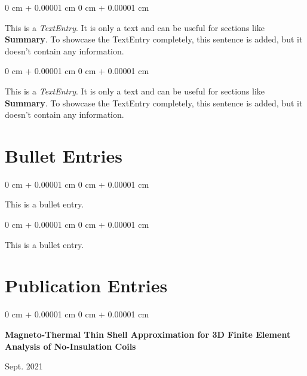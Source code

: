 \documentclass[10pt, letterpaper]{article}
\newenvironment{onecolentry}{
    \begin{adjustwidth}{
        0 cm + 0.00001 cm
    }{
        0 cm + 0.00001 cm
    }
}{
    \end{adjustwidth}
} %
\newenvironment{twocolentry}[2][]{
    \onecolentry
    \def\secondColumn{#2}
    \setcolumnwidth{\fill, 4.5 cm}
    \begin{paracol}{2}
}{
    \switchcolumn \raggedleft \secondColumn
    \end{paracol}
    \endonecolentry
} %
\begin{document}
        \vspace{0.2 cm}

        \begin{onecolentry}
            This is a \textit{TextEntry}. It is only a text and can be useful for sections like \textbf{Summary}. To showcase the TextEntry completely, this sentence is added, but it doesn't contain any information.
        \end{onecolentry}

        \vspace{0.2 cm}

        \begin{onecolentry}
            This is a \textit{TextEntry}. It is only a text and can be useful for sections like \textbf{Summary}. To showcase the TextEntry completely, this sentence is added, but it doesn't contain any information.
        \end{onecolentry}


    
    \section{Bullet Entries}

        
        \begin{onecolentry}
            \textbullet \hspace{3pt} This is a bullet entry.
        \end{onecolentry}

        \vspace{0.2 cm}

        \begin{onecolentry}
            \textbullet \hspace{3pt} This is a bullet entry.
        \end{onecolentry}


    
    \section{Publication Entries}

        
        \begin{samepage}
            \begin{twocolentry}{
                Sept. 2021
            }
                \textbf{Magneto-Thermal Thin Shell Approximation for 3D Finite Element Analysis of No-Insulation Coils}
            \end{twocolentry}

        \end{samepage}
\end{document}
